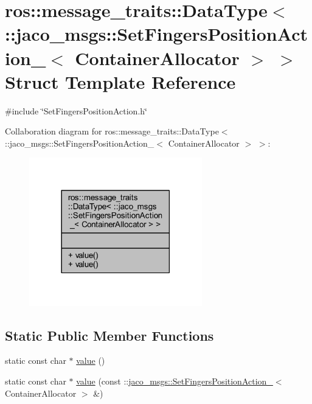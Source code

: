 \hypertarget{structros_1_1message__traits_1_1DataType_3_01_1_1jaco__msgs_1_1SetFingersPositionAction___3_01ContainerAllocator_01_4_01_4}{}\section{ros\+:\+:message\+\_\+traits\+:\+:Data\+Type$<$ \+:\+:jaco\+\_\+msgs\+:\+:Set\+Fingers\+Position\+Action\+\_\+$<$ Container\+Allocator $>$ $>$ Struct Template Reference}
\label{structros_1_1message__traits_1_1DataType_3_01_1_1jaco__msgs_1_1SetFingersPositionAction___3_01ContainerAllocator_01_4_01_4}


{\ttfamily \#include \char`\"{}Set\+Fingers\+Position\+Action.\+h\char`\"{}}



Collaboration diagram for ros\+:\+:message\+\_\+traits\+:\+:Data\+Type$<$ \+:\+:jaco\+\_\+msgs\+:\+:Set\+Fingers\+Position\+Action\+\_\+$<$ Container\+Allocator $>$ $>$\+:
\nopagebreak
\begin{figure}[H]
\begin{center}
\leavevmode
\includegraphics[width=213pt]{d8/d8d/structros_1_1message__traits_1_1DataType_3_01_1_1jaco__msgs_1_1SetFingersPositionAction___3_01Coea53413a098bfd5bfab317152a275307}
\end{center}
\end{figure}
\subsection*{Static Public Member Functions}
\begin{DoxyCompactItemize}
\item 
static const char $\ast$ \hyperlink{structros_1_1message__traits_1_1DataType_3_01_1_1jaco__msgs_1_1SetFingersPositionAction___3_01ContainerAllocator_01_4_01_4_a2f050d0b3c42e9b894e85a95e667ac88}{value} ()
\item 
static const char $\ast$ \hyperlink{structros_1_1message__traits_1_1DataType_3_01_1_1jaco__msgs_1_1SetFingersPositionAction___3_01ContainerAllocator_01_4_01_4_ac8dcdcae81ca3fc1783ee42b5d7b1855}{value} (const \+::\hyperlink{structjaco__msgs_1_1SetFingersPositionAction__}{jaco\+\_\+msgs\+::\+Set\+Fingers\+Position\+Action\+\_\+}$<$ Container\+Allocator $>$ \&)
\end{DoxyCompactItemize}


